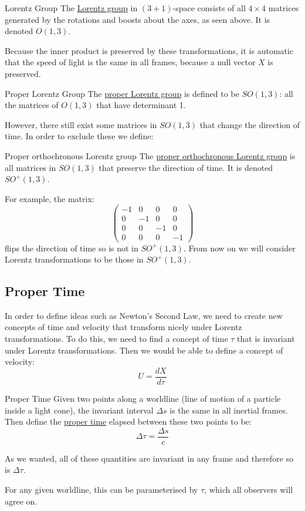 \documentclass[../Main.tex]{subfiles}
\begin{document}
\begin{definition}{Lorentz Group}
    The \underline{Lorentz group} in $(3+1)$-space consists of all $4\times 4$ matrices generated by the rotations and boosts about the axes, as seen above.
    It is denoted $O(1, 3)$.
\end{definition}
Because the inner product is preserved by these transformations, it is automatic that the speed of light is the same in all frames, because a null vector $X$ is preserved.
\begin{definition}{Proper Lorentz Group}
    The \underline{proper Lorentz group} is defined to be $SO(1, 3)$: all the matrices of $O(1, 3)$ that have determinant 1.
\end{definition}
However, there still exist some matrices in $SO(1, 3)$ that change the direction of time. In order to exclude these we define:
\begin{definition}{Proper orthochronous Lorentz group}
    The \underline{proper orthochronous Lorentz group} is all matrices in $SO(1, 3)$ that preserve the direction of time. It is denoted $SO^+(1, 3)$.
\end{definition}
For example, the matrix:
\begin{equation*}
    \begin{pmatrix}
        -1 & 0 & 0 & 0 \\
        0 & -1 & 0 & 0 \\
        0 & 0 & -1 & 0 \\
        0 & 0 & 0 & -1
    \end{pmatrix}
\end{equation*}
flips the direction of time so is not in $SO^+(1, 3)$.
From now on we will consider Lorentz transformations to be those in $SO^+(1, 3)$.
\subsection{Proper Time}
In order to define ideas such as Newton's Second Law, we need to create new concepts of time and velocity that transform nicely under Lorentz transformations. To do this, we need to find a concept of time $\tau$ that is invariant under Lorentz transformations. Then we would be able to define a concept of velocity:
\begin{equation*}
    U = \frac{dX}{d\tau}
\end{equation*}
\begin{definition}{Proper Time}
    Given two points along a worldline (line of motion of a particle inside a light cone), the invariant interval $\Delta s$ is the same in all inertial frames. Then define the \underline{proper time} elapsed between these two points to be:
    \begin{equation*}
        \Delta \tau = \frac{\Delta s}{c}
    \end{equation*}
\end{definition}
\begin{remark}
    As we wanted, all of these quantities are invariant in any frame and therefore so is $\Delta \tau$.
\end{remark}
For any given worldline, this can be parameterised by $\tau$, which all observers will agree on.
\end{document}
